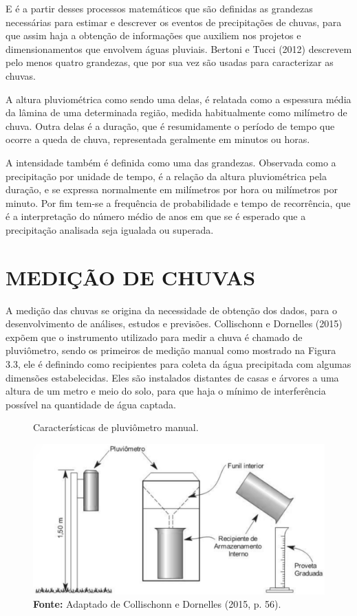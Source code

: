 E é a partir desses processos matemáticos que são definidas as grandezas necessárias para estimar e descrever os eventos de precipitações de chuvas, para que assim haja a obtenção de informações que auxiliem nos projetos e dimensionamentos que envolvem águas pluviais. Bertoni e Tucci (2012) descrevem pelo menos quatro grandezas, que por sua vez são usadas para caracterizar as chuvas.

A altura pluviométrica como sendo uma delas, é relatada como a espessura média da lâmina de uma determinada região, medida habitualmente como milímetro de chuva. Outra delas é a duração, que é resumidamente o período de tempo que ocorre a queda de chuva, representada geralmente em minutos ou horas. 

A intensidade também é definida como uma das grandezas. Observada como a precipitação por unidade de tempo, é a relação da altura pluviométrica pela duração, e se expressa normalmente em milímetros por hora ou milímetros por minuto. Por fim tem-se a frequência de probabilidade e tempo de recorrência, que é a interpretação do número médio de anos em que se é esperado que a precipitação analisada seja igualada ou superada.

\section{MEDIÇÃO DE CHUVAS}

A medição das chuvas se origina da necessidade de obtenção dos dados, para o desenvolvimento de análises, estudos e previsões. Collischonn e Dornelles (2015) expõem que o instrumento utilizado para medir a chuva é chamado de pluviômetro, sendo os primeiros de medição manual como mostrado na Figura 3.3, ele é definindo como recipientes para coleta da água precipitada com algumas dimensões estabelecidas. Eles são instalados distantes de casas e árvores a uma altura de um metro e meio do solo, para que haja o mínimo de interferência possível na quantidade de água captada.\bigskip

\begin{figure}[!ht]
	\centering
	\caption{Características de pluviômetro manual.}
	\includegraphics[width=.7625\linewidth]{figuras/caracteristicas_de_um_pluviometro_de_leitura_manual.png}
	\caption*{\textbf{Fonte:} Adaptado de Collischonn e Dornelles (2015, p. 56).}
	\label{fig:caracteristicas_de_um_pluviometro_de_leitura_manual.png}
\end{figure}

